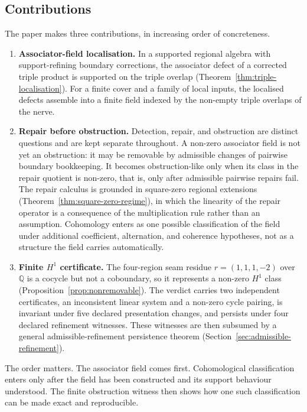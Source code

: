 \documentclass[11pt]{article}
\newcommand{\Q}{\mathbb{Q}}
\begin{document}
\subsection{Contributions}
\label{sec:contributions}

The paper makes three contributions, in increasing order of concreteness.

\begin{enumerate}[label=(\arabic*)]
\item \textbf{Associator-field localisation.} In a supported regional algebra with support-refining boundary corrections, the associator defect of a corrected triple product is supported on the triple overlap (Theorem~\ref{thm:triple-localisation}). For a finite cover and a family of local inputs, the localised defects assemble into a finite field indexed by the non-empty triple overlaps of the nerve.

\item \textbf{Repair before obstruction.} Detection, repair, and obstruction are distinct questions and are kept separate throughout. A non-zero associator field is not yet an obstruction: it may be removable by admissible changes of pairwise boundary bookkeeping. It becomes obstruction-like only when its class in the repair quotient is non-zero, that is, only after admissible pairwise repairs fail. The repair calculus is grounded in square-zero regional extensions (Theorem~\ref{thm:square-zero-regime}), in which the linearity of the repair operator is a consequence of the multiplication rule rather than an assumption. Cohomology enters as one possible classification of the field under additional coefficient, alternation, and coherence hypotheses, not as a structure the field carries automatically.

\item \textbf{Finite \(H^1\) certificate.} The four-region seam residue \(r=(1,1,1,-2)\) over \(\Q\) is a cocycle but not a coboundary, so it represents a non-zero \(H^1\) class (Proposition~\ref{prop:nonremovable}). The verdict carries two independent certificates, an inconsistent linear system and a non-zero cycle pairing, is invariant under five declared presentation changes, and persists under four declared refinement witnesses. These witnesses are then subsumed by a general admissible-refinement persistence theorem (Section~\ref{sec:admissible-refinement}).
\end{enumerate}

The order matters. The associator field comes first. Cohomological classification enters only after the field has been constructed and its support behaviour understood. The finite obstruction witness then shows how one such classification can be made exact and reproducible.
\end{document}
